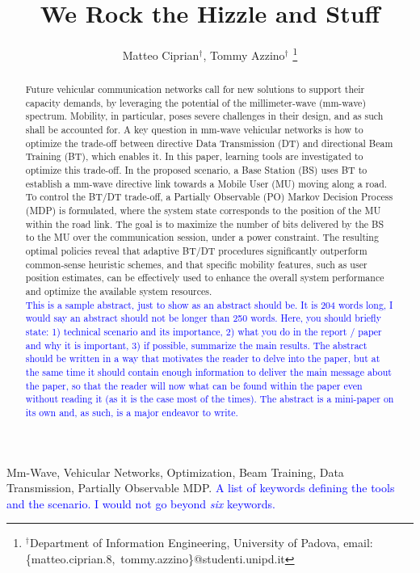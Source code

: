 \documentclass[10pt, conference, letterpaper]{IEEEtran}
\title{We Rock the Hizzle and Stuff}
\author{Matteo Ciprian$^\dag$, Tommy Azzino$^\dag$
\thanks{$^\dag$Department of Information Engineering, University of Padova, email: \{matteo.ciprian.8,\ tommy.azzino\}@studenti.unipd.it}

}
\newcommand\MR[1]{\textcolor{blue}{#1}}
\begin{document}
\maketitle

\begin{abstract}
Future vehicular communication networks call for new solutions to support their capacity demands, by leveraging the potential of the \mbox{millimeter-wave} (\mbox{mm-wave}) spectrum. Mobility, in particular, poses severe challenges in their design, and as such shall be accounted for. A key question in \mbox{mm-wave} vehicular networks is how to optimize the \mbox{trade-off} between directive Data Transmission (DT) and directional Beam Training (BT), which enables it. In this paper, learning tools are investigated to optimize this \mbox{trade-off}. In the proposed scenario, a Base Station (BS) uses BT to establish a \mbox{mm-wave} directive link towards a Mobile User (MU) moving along a road. To control the BT/DT \mbox{trade-off}, a Partially Observable (PO) Markov Decision Process (MDP) is formulated, where the system state corresponds to the position of the MU within the road link. The goal is to maximize the number of bits delivered by the BS to the MU over the communication session, under a power constraint. The resulting optimal policies reveal that adaptive BT/DT procedures significantly outperform \mbox{common-sense} heuristic schemes, and that specific mobility features, such as user position estimates, can be effectively used to enhance the overall system performance and optimize the available system resources.\\ \MR{This is a sample abstract, just to show as an abstract should be. It is 204 words long, I would say an abstract should not be longer than 250 words. Here, you should briefly state: 1) technical scenario and its importance, 2) what you do in the report / paper and why it is important, 3) if possible, summarize the main results. The abstract should be written in a way that motivates the reader to delve into the paper, but at the same time it should contain enough information to deliver the main message about the paper, so that the reader will now what can be found within the paper even without reading it (as it is the case most of the times). The abstract is a mini-paper on its own and, as such, is a major endeavor to write.}
\end{abstract}

\IEEEkeywords
Mm-Wave, Vehicular Networks, Optimization, Beam Training, Data Transmission, Partially Observable MDP. \MR{A list of keywords defining the tools and the scenario. I would not go beyond {\it six} keywords.}
\endIEEEkeywords














\end{document}
